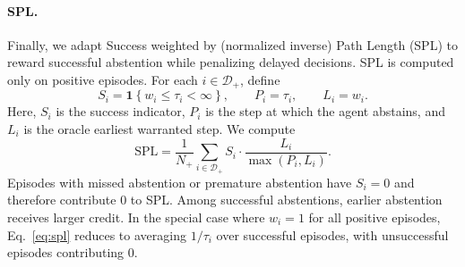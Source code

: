 \documentclass{article}
\newcommand{\ind}[1]{\mathbf{1}\!\left\{#1\right\}}
\begin{document}

\paragraph{SPL.}
Finally, we adapt Success weighted by (normalized inverse) Path Length (SPL) \cite{anderson2018evaluation} to reward successful abstention while penalizing delayed decisions. SPL is computed only on positive episodes. For each $i\in\mathcal{D}_{+}$, define
\begin{equation}
S_i = \ind{w_i \le \tau_i < \infty},
\qquad
P_i = \tau_i,
\qquad
L_i = w_i.
\label{eq:spl_terms}
\end{equation}
Here, $S_i$ is the success indicator, $P_i$ is the step at which the agent abstains, and $L_i$ is the oracle earliest warranted step. We compute
\begin{equation}
\mathrm{SPL}
=
\frac{1}{N_{+}}
\sum_{i \in \mathcal{D}_{+}}
S_i \cdot \frac{L_i}{\max(P_i,L_i)}.
\label{eq:spl}
\end{equation}
Episodes with missed abstention or premature abstention have $S_i=0$ and therefore contribute $0$ to SPL. Among successful abstentions, earlier abstention receives larger credit. In the special case where $w_i=1$ for all positive episodes, Eq.~\eqref{eq:spl} reduces to averaging $1/\tau_i$ over successful episodes, with unsuccessful episodes contributing $0$.
\end{document}
